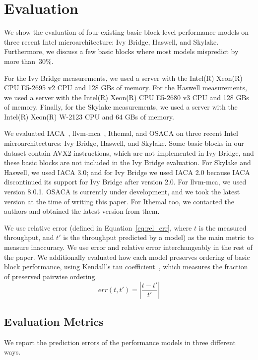 \section{Evaluation}
We show the evaluation of four existing basic block-level
performance models on three recent Intel microarchitecture:
Ivy Bridge, Haswell, and Skylake. Furthermore, we discuss a few basic blocks where most models
mispredict by more than~30\%.

For the Ivy Bridge measurements,
we used a server with the Intel(R) Xeon(R) CPU E5-2695 v2 CPU and 128 GBs of memory. 
For the Haswell measurements,
we used a server with the Intel(R) Xeon(R) CPU E5-2680 v3 CPU and 128 GBs of memory. 
Finally, for the Skylake measurements, we used a server with the Intel(R) Xeon(R) W-2123 CPU and 64 GBs of memory. 

We evaluated IACA~\cite{iaca}, llvm-mca~\cite{llvm-mca}, Ithemal\cite{ithemal}, and OSACA\cite{osaca}
on three recent Intel microarchitectures: Ivy Bridge, Haswell, and Skylake.
Some basic blocks in our dataset contain AVX2 instructions,
which are not implemented in Ivy Bridge,
and these basic blocks are not included in the Ivy Bridge evaluation.
For Skylake and Haswell, we used IACA 3.0;
and for Ivy Bridge we used IACA 2.0 because IACA discontinued its support for
Ivy Bridge after version 2.0.
For llvm-mca, we used version 8.0.1.
OSACA is currently under development, and we took the latest version
at the time of writing this paper.
For Ithemal too, we contacted the authors and obtained the latest version from them.

We use relative error (defined in Equation~\ref{eq:rel_err}, where $t$ is the measured throughput, and $t'$ is the throughput predicted by a model)
as the main metric to measure inaccuracy.
We use error and relative error interchangeably in the rest of the paper.
We additionally evaluated how each model preserves ordering of basic block performance,
using Kendall's tau coefficient~\cite{kendalltau},
which measures the fraction of preserved pairwise ordering.
\begin{equation}
\mathit{err}(t, t') = \left| \frac{t - t'}{t'} \right| 
\label{eq:rel_err}
\end{equation}

\subsection{Evaluation Metrics}\label{results}
We report the prediction errors of the performance models in three different ways.

